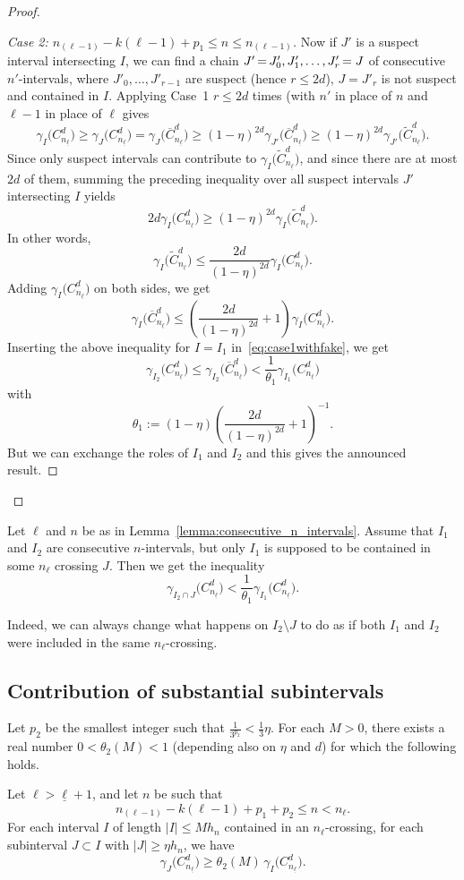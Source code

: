 \documentclass[AHL,Unicode,longabstracts]{cedram}
\newcommand{\egdef}{:=}
\newcommand{\cd}{C^{d}}
\newcommand{\lb}{\underline{\ell}}
\newcommand{\Gam}[1]{\gamma_{#1}\bigl(\cd_{n_{\lb}}\bigr)}
\newcommand{\Gamb}[1]{\gamma_{#1}\bigl(\overline{C}^d_{n_{\lb}}\bigr)}
\newcommand{\Gamt}[1]{\gamma_{#1}\bigl(\tilde{C}^d_{n_{\lb}}\bigr)}
\newcommand*{\Mk}{\mkern -2mu}
\begin{document}
\begin{proof}
\begin{proof}[Case 2: $n_{(\ell-1)}-k(\ell-1)+p_1\le n\le n_{(\ell-1)}$]
Now if $J'$ is a suspect interval intersecting $I$, we can find a chain $J'\Mk=\Mk J'_0,J'_1,\ldots,J'_{r}\Mk=J$ of consecutive $n'$-intervals, where $J'_0,\ldots,J'_{r-1}$ are suspect (hence $r\le 2d$), $J=J'_r$ is not suspect and contained in $I$. Applying Case~1 $r\le 2d$ times (with $n'$ in place of $n$ and $\ell-1$ in place of $\ell$ gives
\[
\Gam{I} \ge \Gam{J} = \Gamb{J} \ge (1-\eta)^{2d} \Gamb{J'} \ge (1-\eta)^{2d}\Gamt{J'}.
\]
Since only suspect intervals can contribute to $\Gamt{I}$, and since there are at most $2d$ of them, summing the preceding inequality over all suspect intervals $J'$ intersecting $I$ yields
\[
2d \Gam{I} \ge (1-\eta)^{2d}\Gamt{I}.
\]
In other words,
\[
\Gamt{I} \le \frac{2d}{(1-\eta)^{2d}} \Gam{I}.
\]
Adding $\Gam{I}$ on both sides, we get
\[
\Gamb{I} \le \left(\frac{2d}{(1-\eta)^{2d}} + 1 \right) \Gam{I}.
\]
Inserting the above inequality for $I=I_1$ in~\eqref{eq:case1withfake}, we get
\[
\Gam{I_2} \le \Gamb{I_2} < \frac{1}{\theta_1} \Gam{I_1}
\]
with
\[
\theta_1\egdef (1-\eta) \left(\frac{2d}{(1-\eta)^{2d}} + 1 \right)^{-1}.
\]
But we can exchange the roles of $I_1$ and $I_2$ and this gives the announced result.
\end{proof}
\let\qed\relax
\end{proof}

\begin{rema}\label{rem:extremities}
Let $\ell$ and $n$ be as in Lemma~\ref{lemma:consecutive_n_intervals}. Assume that $I_1$ and $I_2$ are consecutive $n$-intervals, but only $I_1$ is supposed to be contained in some $n_\ell$ crossing $J$. Then we get the inequality
\[
\Gam{I_2\cap J} < \frac{1}{\theta_1} \Gam{I_1}.
\]
\end{rema}

Indeed, we can always change what happens on $I_2\setminus J$ to do as if both $I_1$ and $I_2$ were included in the same $n_\ell$-crossing.


\subsection{Contribution of substantial subintervals}
\label{sec:4.2}

\begin{lemm}\label{lemma:ac}
Let $p_2$ be the smallest integer such that $\frac{1}{3^{p_2}}<\frac{1}{3}\eta$. For each $M>0$, there exists a real number $0<\theta_2(M)<1$ (depending also on $\eta$ and $d$) for which the following holds.

Let $\ell>\lb+1$, and let $n$ be such that
\begin{equation}\label{eq:condition_n}
n_{(\ell-1)} -k(\ell-1)+p_1+p_2 \le n < n_\ell.
\end{equation}
For each interval $I$ of length $|I|\le M h_n$ contained in an $n_\ell$-crossing, for each subinterval $J\subset I$ with $|J|\ge \eta h_n$, we have
\[
\Gam{J}\ge \theta_2(M)\, \Gam{I}.
\]
\end{lemm}
\end{document}
